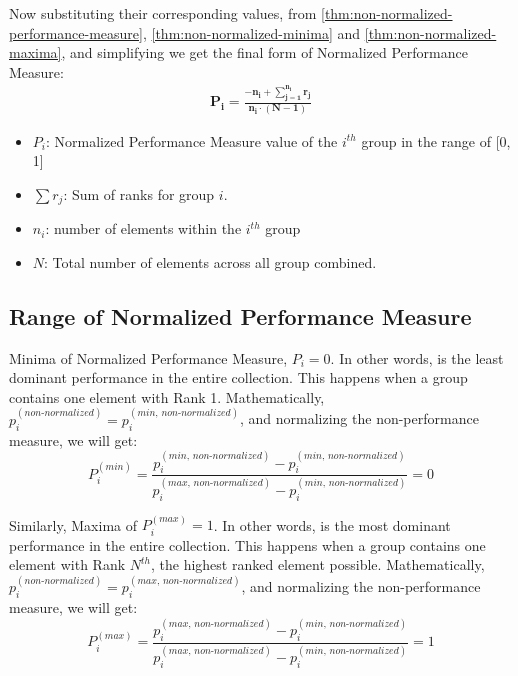 \documentclass[a4paper,fleqn,review]{cas-sc}
\begin{document}
Now substituting their corresponding values, from \autoref{thm:non-normalized-performance-measure}, \autoref{thm:non-normalized-minima} and \autoref{thm:non-normalized-maxima}, and simplifying we get the final form of Normalized Performance Measure:
\begin{align*}
	\boxed{
		\mathbf{
			P_i = \frac{-n_i +  \sum\limits_{j=1}^{n_i} r_j}{n_i \cdot (N - 1)}}
	}
\end{align*}
\begin{itemize}
	\item[] \textbf{$P_i$}: Normalized Performance Measure value of the $i^{th}$ group in the range of [0, 1]
	\item[] \textbf{$\sum r_j$}: Sum of ranks for group $i$.
	\item[] \textbf{$n_i$}: number of elements within the $i^{th}$ group
	\item[] \textbf{$N$}: Total number of elements across all group combined.
\end{itemize}

\subsection{Range of Normalized Performance Measure}
Minima of Normalized Performance Measure, $P_i = 0$. In other words, is the least dominant performance in the entire collection. This happens when a group contains one element with Rank 1. Mathematically, $p_i^{(non\text{-}normalized)} =  p_i^{(min, \, non\text{-}normalized)}$, and normalizing the non-performance measure, we will get:
\begin{equation}
	P_i^{(min)} = \frac{p_i^{(min, \, non\text{-}normalized)} - p_i^{(min, \, non\text{-}normalized)}}{p_i^{(max, \, non\text{-}normalized)} - p_i^{(min, \, non\text{-}normalized)}} = 0
\end{equation}

Similarly,
Maxima of $P_i^{(max)} = 1$. In other words, is the most dominant performance in the entire collection. This happens when a group contains one element with Rank $N^{th}$, the highest ranked element possible. Mathematically, $p_i^{(non\text{-}normalized)} =  p_i^{(max, \, non\text{-}normalized)}$, and normalizing the non-performance measure, we will get:
\begin{equation}
	P_i^{(max)} = \frac{p_i^{(max, \, non\text{-}normalized)} - p_i^{(min, \, non\text{-}normalized)}}{p_i^{(max, \, non\text{-}normalized)} - p_i^{(min, \, non\text{-}normalized)}} = 1
\end{equation}
\end{document}
